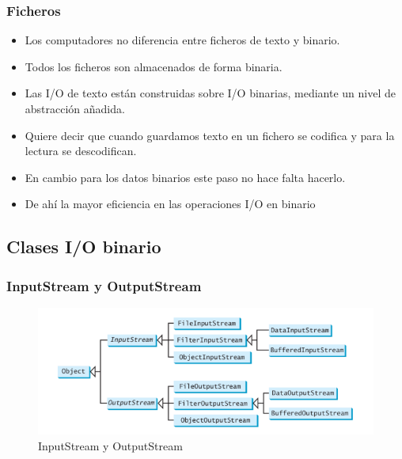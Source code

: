 \documentclass{beamer}
\begin{document}
\begin{frame}
\frametitle{Ficheros}
\begin{itemize}[<+->]
\item Los computadores no diferencia entre ficheros de texto y binario.
\item Todos los ficheros son almacenados de forma binaria.
\item Las I/O de texto están construidas sobre I/O binarias, mediante un nivel de abstracción añadida.
\item Quiere decir que cuando guardamos texto en un fichero se codifica y para la lectura se descodifican.
\item En cambio para los datos binarios este paso no hace falta hacerlo.
\item De ahí la mayor eficiencia en las operaciones I/O en binario
\end{itemize} 
\end{frame}

\subsection{Clases I/O binario}
\begin{frame}
\frametitle{InputStream y OutputStream} 
\begin{figure}
\includegraphics[scale=0.6]{imagenes/io.png} 
\caption{InputStream y OutputStream}
\end{figure} 
\end{frame}
\end{document}
